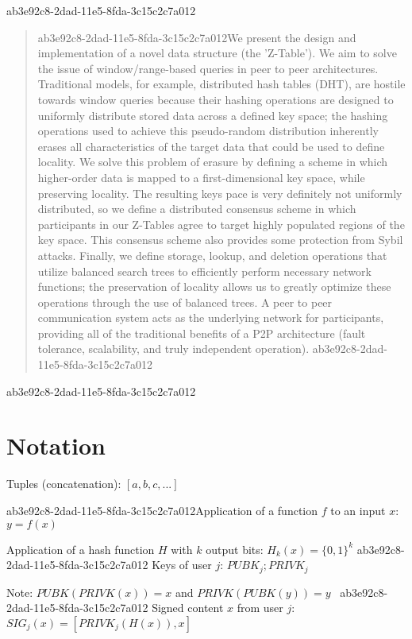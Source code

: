 \documentclass[12pt]{article}
\begin{document}
ab3e92c8-2dad-11e5-8fda-3c15c2c7a012
\maketitle

\begin{abstract}
ab3e92c8-2dad-11e5-8fda-3c15c2c7a012We present the design and implementation of a novel data structure (the 'Z-Table'). We aim to solve the issue of window/range-based queries in peer to peer architectures. Traditional models, for example,  distributed hash tables (DHT), are hostile towards window queries because their hashing operations are designed to uniformly distribute stored data across a defined key space; the hashing operations used to achieve this pseudo-random distribution inherently erases all characteristics of the target data that could be used to define locality. We solve this problem of erasure by defining a scheme in which higher-order data is mapped to a first-dimensional key space, while preserving locality. The resulting keys pace is very definitely not uniformly distributed, so we define a distributed consensus scheme in which participants in our Z-Tables agree to target highly populated regions of the key space. This consensus scheme also provides some protection from Sybil attacks. Finally, we define storage, lookup, and deletion operations that utilize balanced search trees to efficiently perform necessary network functions; the preservation of locality allows us to greatly optimize these operations through the use of balanced trees. A peer to peer communication system acts as the underlying network for participants, providing all of the traditional benefits of a P2P architecture (fault tolerance, scalability, and truly independent operation).
ab3e92c8-2dad-11e5-8fda-3c15c2c7a012\end{abstract}

ab3e92c8-2dad-11e5-8fda-3c15c2c7a012\section{Notation}

Tuples (concatenation): $[a,b,c,...]$

ab3e92c8-2dad-11e5-8fda-3c15c2c7a012Application of a function $f$ to an input $x$: $y=f(x)$

Application of a hash function $H$ with $k$ output bits: $H_{k}(x) = \{0,1\}^k$
ab3e92c8-2dad-11e5-8fda-3c15c2c7a012
Keys of user $j$: $ PUBK_j; PRIVK_j $

Note: $PUBK(PRIVK(x)) = x$ and $PRIVK(PUBK(y)) = y$~
ab3e92c8-2dad-11e5-8fda-3c15c2c7a012
Signed content $x$ from user $j$: $SIG_j(x) = \left[ PRIVK_j( H(x) ), x \right]$
\end{document}
